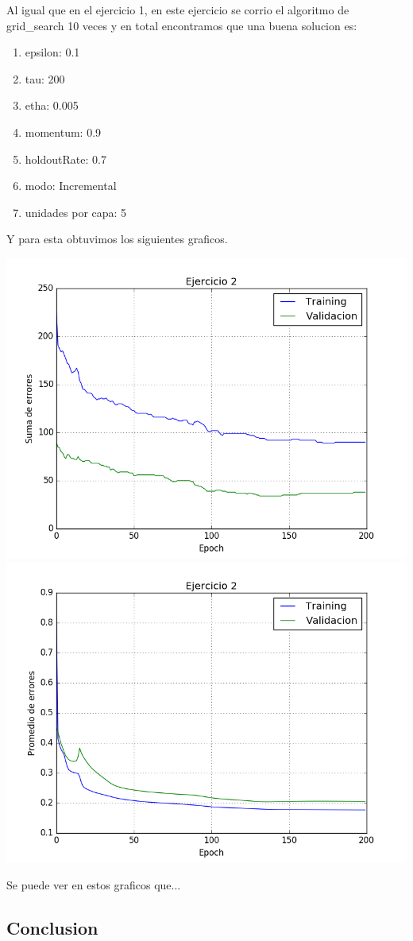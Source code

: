 Al igual que en el ejercicio 1, en este ejercicio se corrio el algoritmo de grid\_search 10 veces y en total encontramos que una buena solucion es:

\begin{enumerate}
\item epsilon: 0.1
\item tau: 200
\item etha: 0.005
\item momentum: 0.9
\item holdoutRate: 0.7
\item modo: Incremental
\item unidades por capa: 5
\end{enumerate}

Y para esta obtuvimos los siguientes graficos.

\includegraphics[scale=0.4]{img/ej200050915sum}
\includegraphics[scale=0.4]{img/ej200050915mean}

Se puede ver en estos graficos que...


\subsection{Conclusion}
